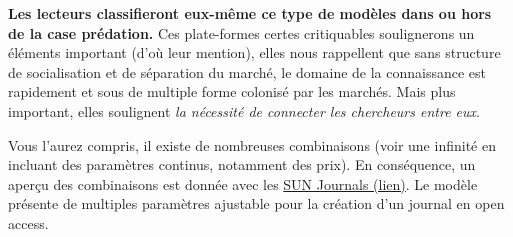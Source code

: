 {%
%
%
%
%
%
% 
%
%
%
%
%
%
%
%
%
% 
%


%
%
%
%
%
%
%
}
\textbf{Les lecteurs classifieront eux-même ce type de modèles dans ou hors de la case prédation.}
Ces plate-formes certes critiquables soulignerons un éléments important (d'où leur mention), elles nous rappellent que sans structure de socialisation et de séparation du marché, le domaine de la connaissance est rapidement et sous de multiple forme colonisé par les marchés.
Mais plus important, elles soulignent \emph{la nécessité de connecter les chercheurs entre eux}.

Vous l'aurez compris, il existe de nombreuses combinaisons (voir une infinité en incluant des paramètres continus, notamment des prix).
En conséquence, un aperçu des combinaisons est donnée avec les \href{http://wiki.lib.sun.ac.za/index.php/SUNJournals}{SUN Journals (lien)}.
Le modèle présente de multiples paramètres ajustable pour la création d'un journal en open access.


